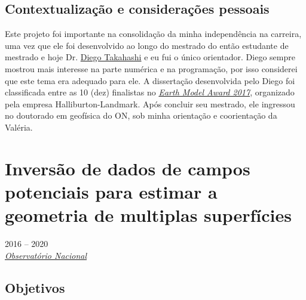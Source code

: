 \subsection*{Contextualização e considerações pessoais}
\label{subsec:proeto-diego-consideracoes}

Este projeto foi importante na consolidação da minha independência na carreira,
uma vez que ele foi desenvolvido ao longo do mestrado do então estudante de mestrado e
hoje Dr. \href{https://lattes.cnpq.br/4939493474727725}{Diego Takahashi} e eu fui o
único orientador.
Diego sempre mostrou mais interesse na parte numérica e na programação, por isso 
considerei que este tema era adequado para ele.
A dissertação desenvolvida pelo Diego foi classificada entre as 10 (dez) finalistas no 
\href{https://www.geolsoc.org.uk/Education-and-Careers/Grants/Earth-Model-Award}{\textit{Earth Model Award 2017}}, organizado pela empresa Halliburton-Landmark.
Após concluir seu mestrado, ele ingressou no doutorado em geofísica do ON, sob minha
orientação e coorientação da Valéria.

\clearpage

\section{Inversão de dados de campos potenciais para estimar a geometria de multiplas superfícies} 
\label{sec:projeto-Marcela}

 2016 -- 2020
\vspace{0.3\baselineskip}\\
 \href{https://www.gov.br/observatorio/pt-br}{\textsl{Observatório Nacional}}
\parbox{0.03\textwidth}{\vspace{-0.2\baselineskip} \hfill {}}

\subsection*{Objetivos}

